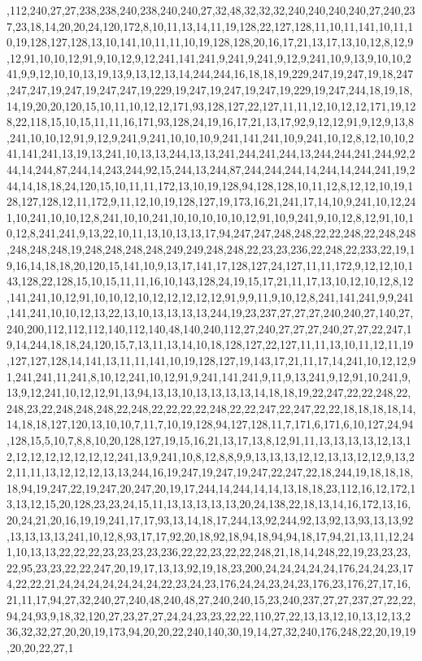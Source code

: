 ,112,240,27,27,238,238,240,238,240,240,27,32,48,32,32,32,240,240,240,240,27,240,237,23,18,14,20,20,24,120,172,8,10,11,13,14,11,19,128,22,127,128,11,10,11,141,10,11,10,19,128,127,128,13,10,141,10,11,11,10,19,128,128,20,16,17,21,13,17,13,10,12,8,12,9,12,91,10,10,12,91,9,10,12,9,12,241,141,241,9,241,9,241,9,12,9,241,10,9,13,9,10,10,241,9,9,12,10,10,13,19,13,9,13,12,13,14,244,244,16,18,18,19,229,247,19,247,19,18,247,247,247,19,247,19,247,247,19,229,19,247,19,247,19,247,19,229,19,247,244,18,19,18,14,19,20,20,120,15,10,11,10,12,12,171,93,128,127,22,127,11,11,12,10,12,12,171,19,128,22,118,15,10,15,11,11,16,171,93,128,24,19,16,17,21,13,17,92,9,12,12,91,9,12,9,13,8,241,10,10,12,91,9,12,9,241,9,241,10,10,10,9,241,141,241,10,9,241,10,12,8,12,10,10,241,141,241,13,19,13,241,10,13,13,244,13,13,241,244,241,244,13,244,244,241,244,92,244,14,244,87,244,14,243,244,92,15,244,13,244,87,244,244,244,14,244,14,244,241,19,244,14,18,18,24,120,15,10,11,11,172,13,10,19,128,94,128,128,10,11,12,8,12,12,10,19,128,127,128,12,11,172,9,11,12,10,19,128,127,19,173,16,21,241,17,14,10,9,241,10,12,241,10,241,10,10,12,8,241,10,10,241,10,10,10,10,10,12,91,10,9,241,9,10,12,8,12,91,10,10,12,8,241,241,9,13,22,10,11,13,10,13,13,17,94,247,247,248,248,22,22,248,22,248,248,248,248,248,19,248,248,248,248,249,249,248,248,22,23,23,236,22,248,22,233,22,19,19,16,14,18,18,20,120,15,141,10,9,13,17,141,17,128,127,24,127,11,11,172,9,12,12,10,143,128,22,128,15,10,15,11,11,16,10,143,128,24,19,15,17,21,11,17,13,10,12,10,12,8,12,141,241,10,12,91,10,10,12,10,12,12,12,12,12,91,9,9,11,9,10,12,8,241,141,241,9,9,241,141,241,10,10,12,13,22,13,10,13,13,13,13,244,19,23,237,27,27,27,240,240,27,140,27,240,200,112,112,112,140,112,140,48,140,240,112,27,240,27,27,27,240,27,27,22,247,19,14,244,18,18,24,120,15,7,13,11,13,14,10,18,128,127,22,127,11,11,13,10,11,12,11,19,127,127,128,14,141,13,11,11,141,10,19,128,127,19,143,17,21,11,17,14,241,10,12,12,91,241,241,11,241,8,10,12,241,10,12,91,9,241,141,241,9,11,9,13,241,9,12,91,10,241,9,13,9,12,241,10,12,12,91,13,94,13,13,10,13,13,13,13,14,18,18,19,22,247,22,22,248,22,248,23,22,248,248,248,22,248,22,22,22,22,248,22,22,247,22,247,22,22,18,18,18,18,14,14,18,18,127,120,13,10,10,7,11,7,10,19,128,94,127,128,11,7,171,6,171,6,10,127,24,94,128,15,5,10,7,8,8,10,20,128,127,19,15,16,21,13,17,13,8,12,91,11,13,13,13,13,12,13,12,12,12,12,12,12,12,12,241,13,9,241,10,8,12,8,8,9,9,13,13,13,12,12,13,13,12,12,9,13,22,11,11,13,12,12,12,13,13,244,16,19,247,19,247,19,247,22,247,22,18,244,19,18,18,18,18,94,19,247,22,19,247,20,247,20,19,17,244,14,244,14,14,13,18,18,23,112,16,12,172,13,13,12,15,20,128,23,23,24,15,11,13,13,13,13,13,20,24,138,22,18,13,14,16,172,13,16,20,24,21,20,16,19,19,241,17,17,93,13,14,18,17,244,13,92,244,92,13,92,13,93,13,13,92,13,13,13,13,241,10,12,8,93,17,17,92,20,18,92,18,94,18,94,94,18,17,94,21,13,11,12,241,10,13,13,22,22,22,23,23,23,23,236,22,22,23,22,22,248,21,18,14,248,22,19,23,23,23,22,95,23,23,22,22,247,20,19,17,13,13,92,19,18,23,200,24,24,24,24,24,176,24,24,23,174,22,22,21,24,24,24,24,24,24,24,22,23,24,23,176,24,24,23,24,23,176,23,176,27,17,16,21,11,17,94,27,32,240,27,240,48,240,48,27,240,240,15,23,240,237,27,27,237,27,22,22,94,24,93,9,18,32,120,27,23,27,27,24,24,23,23,22,22,110,27,22,13,13,12,10,13,12,13,236,32,32,27,20,20,19,173,94,20,20,22,240,140,30,19,14,27,32,240,176,248,22,20,19,19,20,20,22,27,1